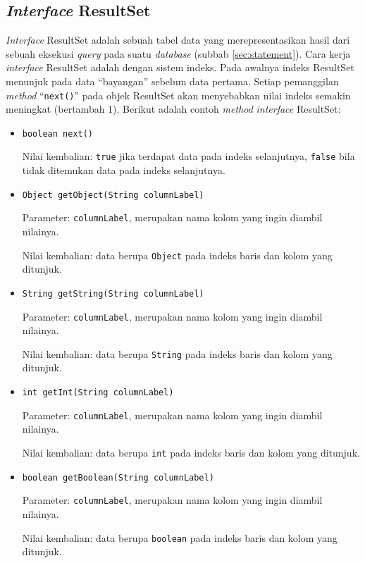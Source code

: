 \subsection{\textit{Interface} ResultSet}
\label{sec:resultset}
\textit{Interface} ResultSet adalah sebuah tabel data yang merepresentasikan hasil dari sebuah eksekusi \textit{query} pada suatu \textit{database}\cite{javadocumentation} (subbab \ref{sec:statement}). Cara kerja \textit{interface} ResultSet adalah dengan sistem indeks. Pada awalnya indeks ResultSet menunjuk pada data ``bayangan'' sebelum data pertama. Setiap pemanggilan \textit{method} ``\texttt{next()}'' pada objek ResultSet akan menyebabkan nilai indeks semakin meningkat (bertambah 1). Berikut adalah contoh \textit{method} \textit{interface} ResultSet:
\begin{itemize}
	\item \texttt{boolean next()}
	
	Nilai kembalian: \texttt{true} jika terdapat data pada indeks selanjutnya, \texttt{false} bila tidak ditemukan data pada indeks selanjutnya.

	\item \texttt{Object getObject(String columnLabel)}
	
	Parameter: \texttt{columnLabel}, merupakan nama kolom yang ingin diambil nilainya.
	
	Nilai kembalian: data berupa \texttt{Object} pada indeks baris dan kolom yang ditunjuk.
	
	\item \texttt{String getString(String columnLabel)}
	
	Parameter: \texttt{columnLabel}, merupakan nama kolom yang ingin diambil nilainya.
	
	Nilai kembalian: data berupa \texttt{String} pada indeks baris dan kolom yang ditunjuk.
	
	\item \texttt{int getInt(String columnLabel)}
	
	Parameter: \texttt{columnLabel}, merupakan nama kolom yang ingin diambil nilainya.
	
	Nilai kembalian: data berupa \texttt{int} pada indeks baris dan kolom yang ditunjuk.
	
	\item \texttt{boolean getBoolean(String columnLabel)}
	
	Parameter: \texttt{columnLabel}, merupakan nama kolom yang ingin diambil nilainya.
	
	Nilai kembalian: data berupa \texttt{boolean} pada indeks baris dan kolom yang ditunjuk.
\end{itemize}



